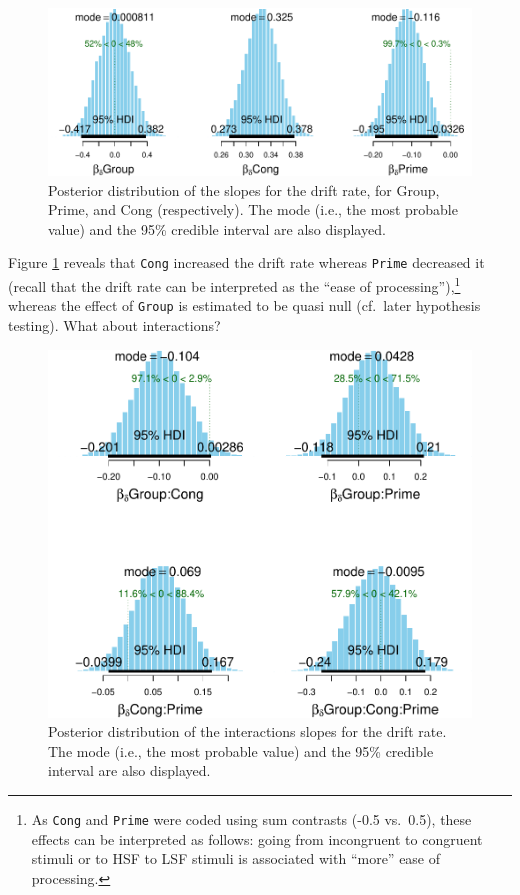 \documentclass[
  11pt,
  english,
  ,doc,floatsintext]{apa6}
\begin{document}
\begin{figure}[!htb]

{\centering \includegraphics[width=1\linewidth]{supplementary_materials_files/figure-latex/posterior-slopes-drift-1} 

}

\caption{Posterior distribution of the slopes for the drift rate, for Group, Prime, and Cong (respectively). The mode (i.e., the most probable value) and the 95\% credible interval are also displayed.}\label{fig:posterior-slopes-drift}
\end{figure}

Figure \ref{fig:posterior-slopes-drift} reveals that \texttt{Cong} increased the drift rate whereas \texttt{Prime} decreased it (recall that the drift rate can be interpreted as the ``ease of processing''),\footnote{As \texttt{Cong} and \texttt{Prime} were coded using sum contrasts (-0.5 vs.~0.5), these effects can be interpreted as follows: going from incongruent to congruent stimuli or to HSF to LSF stimuli is associated with ``more'' ease of processing.} whereas the effect of \texttt{Group} is estimated to be quasi null (cf.~later hypothesis testing). What about interactions?

\begin{figure}[!htb]

{\centering \includegraphics[width=0.75\linewidth]{supplementary_materials_files/figure-latex/posterior-interactions-drift-1} 

}

\caption{Posterior distribution of the interactions slopes for the drift rate. The mode (i.e., the most probable value) and the 95\% credible interval are also displayed.}\label{fig:posterior-interactions-drift}
\end{figure}
\end{document}
